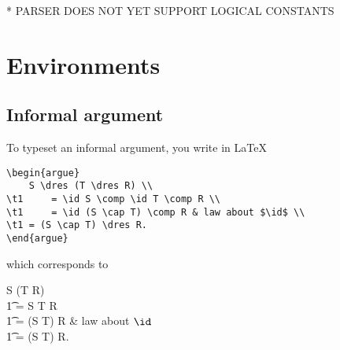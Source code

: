 \documentclass{article}
\begin{document}
%

* PARSER DOES NOT YET SUPPORT LOGICAL CONSTANTS

\newpage
\appendix

\section{Environments}\label{app:ref-env}

\subsection{Informal argument}

To typeset an informal argument, you write in \LaTeX\
\begin{verbatim}
\begin{argue}
    S \dres (T \dres R) \\
\t1     = \id S \comp \id T \comp R \\
\t1     = \id (S \cap T) \comp R & law about $\id$ \\
\t1	= (S \cap T) \dres R.
\end{argue}
\end{verbatim}
%
which corresponds to
%
\begin{argue}
    S \dres (T \dres R) \\
\t1     = \id S \comp \id T \comp R \\
\t1     = \id (S \cap T) \comp R & law about $\id$ \\
\t1	= (S \cap T) \dres R.
\end{argue}
\end{document}
